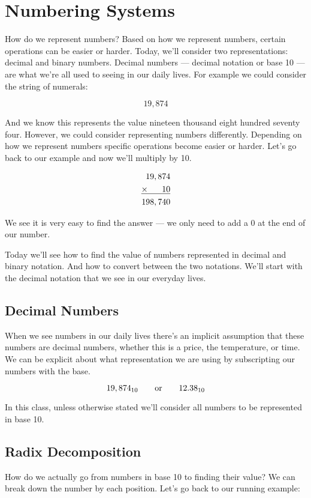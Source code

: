 \chapter{Numbering Systems}
How do we represent numbers? Based on how we represent numbers, certain operations
can be easier or harder. Today, we’ll consider two representations: decimal and
binary numbers. Decimal numbers --- decimal notation or base 10 --- are what we’re
all used to seeing in our daily lives. For example we could consider the string of
numerals:

$$ 19,874 $$

And we know this represents the value nineteen thousand eight hundred seventy four.
However, we could consider representing numbers differently. Depending on how we
represent numbers specific operations become easier or harder. Let’s go back to our
example and now we’ll multiply by 10.

\begin{align*}
19,874&\\
\underline{\times\hspace{6mm}10}&\\
198,740&\\
\end{align*}

We see it is very easy to find the answer --- we only need to add a 0 at the end
of our number.

Today we’ll see how to find the value of numbers represented in decimal and
binary notation. And how to convert between the two notations. We’ll start with
the decimal notation that we see in our everyday lives.

\section{Decimal Numbers}
When we see numbers in our daily lives there’s an implicit assumption that these
numbers are decimal numbers, whether this is a price, the temperature, or time.
We can be explicit about what representation we are using by subscripting our
numbers with the base.

$$ 19,874_{10} \hspace{7mm}\text{or}\hspace{7mm}  12.38_{10}$$

In this class, unless otherwise stated we’ll consider all numbers to be
represented in base 10.

\section{Radix Decomposition}
How do we actually go from numbers in base 10 to finding their value? We can break
down the number by each position. Let’s go back to our running example:

